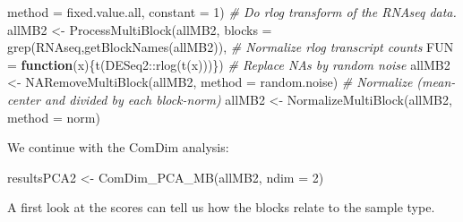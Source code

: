 \documentclass[
]{book}
\newenvironment{Shaded}{\begin{snugshade}}{\end{snugshade}}
\newcommand{\AttributeTok}[1]{\textcolor[rgb]{0.77,0.63,0.00}{#1}}
\newcommand{\CommentTok}[1]{\textcolor[rgb]{0.56,0.35,0.01}{\textit{#1}}}
\newcommand{\ControlFlowTok}[1]{\textcolor[rgb]{0.13,0.29,0.53}{\textbf{#1}}}
\newcommand{\DecValTok}[1]{\textcolor[rgb]{0.00,0.00,0.81}{#1}}
\newcommand{\FunctionTok}[1]{\textcolor[rgb]{0.00,0.00,0.00}{#1}}
\newcommand{\NormalTok}[1]{#1}
\newcommand{\OtherTok}[1]{\textcolor[rgb]{0.56,0.35,0.01}{#1}}
\newcommand{\SpecialCharTok}[1]{\textcolor[rgb]{0.00,0.00,0.00}{#1}}
\newcommand{\StringTok}[1]{\textcolor[rgb]{0.31,0.60,0.02}{#1}}
\begin{document}
\begin{Shaded}
\begin{Highlighting}[]
     \AttributeTok{method =} \StringTok{\textquotesingle{}fixed.value.all\textquotesingle{}}\NormalTok{,}
     \AttributeTok{constant =} \DecValTok{1}\NormalTok{)}
  \CommentTok{\# Do rlog transform of the RNAseq data.}
\NormalTok{  allMB2 }\OtherTok{\textless{}{-}} \FunctionTok{ProcessMultiBlock}\NormalTok{(allMB2,}
     \AttributeTok{blocks =} \FunctionTok{grep}\NormalTok{(}\StringTok{\textquotesingle{}RNAseq\textquotesingle{}}\NormalTok{,}\FunctionTok{getBlockNames}\NormalTok{(allMB2)),}
     \CommentTok{\# Normalize rlog transcript counts}
     \AttributeTok{FUN =} \ControlFlowTok{function}\NormalTok{(x)\{}\FunctionTok{t}\NormalTok{(DESeq2}\SpecialCharTok{::}\FunctionTok{rlog}\NormalTok{(}\FunctionTok{t}\NormalTok{(x)))\})}
  \CommentTok{\# Replace NAs by random noise}
\NormalTok{  allMB2 }\OtherTok{\textless{}{-}} \FunctionTok{NARemoveMultiBlock}\NormalTok{(allMB2, }\AttributeTok{method =} \StringTok{\textquotesingle{}random.noise\textquotesingle{}}\NormalTok{)}
  \CommentTok{\# Normalize (mean{-}center and divided by each block{-}norm)}
\NormalTok{  allMB2 }\OtherTok{\textless{}{-}} \FunctionTok{NormalizeMultiBlock}\NormalTok{(allMB2, }\AttributeTok{method =} \StringTok{\textquotesingle{}norm\textquotesingle{}}\NormalTok{)}
\end{Highlighting}
\end{Shaded}

We continue with the ComDim analysis:

\begin{Shaded}
\begin{Highlighting}[]
\NormalTok{  resultsPCA2 }\OtherTok{\textless{}{-}} \FunctionTok{ComDim\_PCA\_MB}\NormalTok{(allMB2, }\AttributeTok{ndim =} \DecValTok{2}\NormalTok{)}
\end{Highlighting}
\end{Shaded}

A first look at the scores can tell us how the blocks relate to the sample type.
\end{document}
